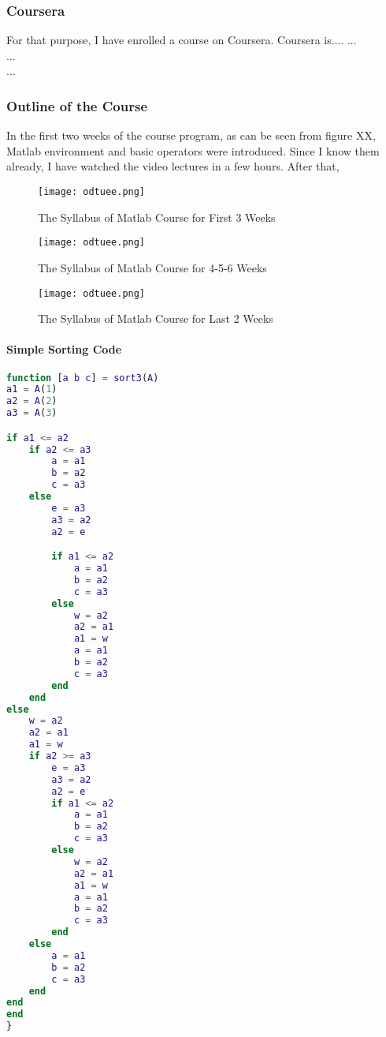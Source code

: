\subsubsection{Coursera}
For that purpose, I have enrolled a course on Coursera. Coursera is....
...\\
...\\
...
\subsubsection{Outline of the Course}
\- \indent 
	In the first two weeks of the course program, as can be seen from figure XX, Matlab environment and basic operators were introduced. Since I know them already, I have watched the video lectures in a few hours. After that,    


\begin{figure}[H]
\texttt{[image: odtuee.png]}\\[1cm]
\caption{\label{fig:cooling}The Syllabus of Matlab Course for First 3 Weeks }
\end{figure}
   

\begin{figure}[H]
\texttt{[image: odtuee.png]}\\[1cm]
\caption{\label{fig:cooling}The Syllabus of Matlab Course for 4-5-6 Weeks }
\end{figure}


\begin{figure}[H]
\texttt{[image: odtuee.png]}\\[1cm]
\caption{\label{fig:cooling}The Syllabus of Matlab Course for Last 2 Weeks }
\end{figure}   
\-

\paragraph{Simple Sorting Code}
\begin{lstlisting}[language=Matlab]
function [a b c] = sort3(A) 
a1 = A(1) 
a2 = A(2) 
a3 = A(3) 

if a1 <= a2 
    if a2 <= a3
        a = a1
        b = a2
        c = a3
    else
        e = a3 
        a3 = a2 
        a2 = e 

        if a1 <= a2 
            a = a1 
            b = a2 
            c = a3 
        else 
            w = a2  
            a2 = a1 
            a1 = w 
            a = a1 
            b = a2 
            c = a3 
        end
    end
else 
    w = a2 
    a2 = a1 
    a1 = w 
    if a2 >= a3 
        e = a3 
        a3 = a2 
        a2 = e 
        if a1 <= a2
            a = a1 
            b = a2 
            c = a3 
        else 
            w = a2 
            a2 = a1 
            a1 = w 
            a = a1 
            b = a2 
            c = a3 
        end 
    else 
        a = a1 
        b = a2 
        c = a3 
    end  
end
end
}
\end{lstlisting}

